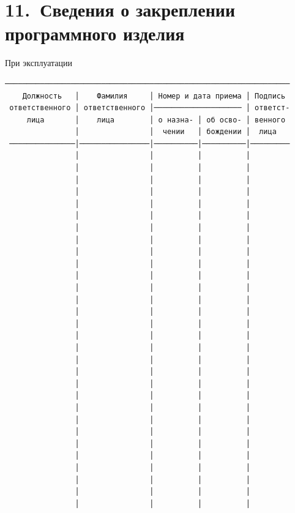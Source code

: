 \documentclass[11pt,a4paper]{article}
\begin{document}
\section*{11.~Сведения о закреплении программного изделия}
\begin{center}При эксплуатации\end{center}
\begin{center}\small
\begin{BVerbatim}
─────────────────────────────────────────────────────────────────
    Должность   │    Фамилия     │ Номер и дата приема │ Подпись
 ответственного │ ответственного │──────────────────── │ ответст-
     лица       │    лица        │ о назна- │ об осво- │ венного
                │                │  чении   │ бождении │  лица
 ───────────────│────────────────│──────────│──────────│─────────
                │                │          │          │
                │                │          │          │
                │                │          │          │
                │                │          │          │
                │                │          │          │
                │                │          │          │
                │                │          │          │
                │                │          │          │
                │                │          │          │
                │                │          │          │
                │                │          │          │
                │                │          │          │
                │                │          │          │
                │                │          │          │
                │                │          │          │
                │                │          │          │
                │                │          │          │
                │                │          │          │
                │                │          │          │
                │                │          │          │
                │                │          │          │
                │                │          │          │
                │                │          │          │
                │                │          │          │
                │                │          │          │
                │                │          │          │
                │                │          │          │
                │                │          │          │
                │                │          │          │
                │                │          │          │

\end{BVerbatim}
\end{center}
\end{document}

